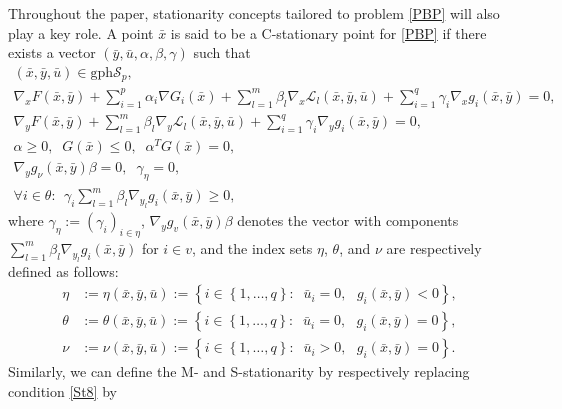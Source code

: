 Throughout the paper, stationarity concepts tailored to problem \eqref{PBP} will also play a key role. A point $\bar{x}$ is said to be a C-stationary point for \eqref{PBP} if there exists a vector $\left(\bar{y},\bar{u}, \alpha,\beta,\gamma\right)$ such that %
	\begin{eqnarray}
	(\bar{x}, \bar{y},\bar{u})\in \mbox{gph}\mathcal{S}_{p},\label{St0}\\
	\nabla_{x}F(\bar{x},\bar{y})+\sum\limits_{i=1}^{p}\alpha_{i}\nabla G_{i}
	(\bar{x})+\sum\limits_{l=1}^{m}\beta_{l}\nabla_{x}\mathcal{L}_{l}(\bar{x}
	,\bar{y},\bar{u})+\sum\limits_{i=1}^{q}\gamma_{i}\nabla_{x}g_{i}(\bar{x}
	,\bar{y})=0,\label{St3}\\
	\nabla_{y}F(\bar{x},\bar{y})+\sum\limits_{l=1}^{m}\beta_{l}\nabla
	_{y}\mathcal{L}_{l}(\bar{x},\bar{y},\bar{u})+\sum\limits_{i=1}^{q}\gamma
	_{i}\nabla_{y}g_{i}(\bar{x},\bar{y})=0,\label{St4}\\[1ex]
	\alpha\geq0,\;\; G(\bar{x})\leq 0, \;\; \alpha^{T}G(\bar{x})=0,\label{St5}\\[1.5ex]
	\nabla_{y}g_{\nu}(\bar{x},\bar{y})\beta=0,  \;\; \gamma_{\eta}=0,\label{St6}\\
	\forall i\in\theta:\;\, \gamma_{i}\sum\limits_{l=1}^{m}\beta_{l}\nabla_{y_{l}}g_{i}(\bar{x},\bar{y})\geq0,\label{St8}
	\end{eqnarray}
	where $\gamma_{\eta}:=(\gamma_{i})_{i\in\eta}$,  $\nabla_{y}g_{v}(\bar{x},\bar{y})\beta$ denotes the vector with components $\sum\limits_{l=1}^{m}\beta_{l}\nabla_{y_{l}}g_{i}(\bar{x},\bar{y})$ for $i\in v$,
	and the index sets $\eta$, $\theta$, and $\nu$ are respectively defined as follows:
	\begin{align}
	\eta &  :=\eta(\bar{x},\bar{y},\bar{u}):=\left\{  i\in\left\{
	1,\ldots,q\right\}:\;\; \bar{u}_{i}=0,\text{ }g_{i}(\bar{x},\bar{y})<0\right\},\label{eq}\\
	\theta &  :=\theta(\bar{x},\bar{y},\bar{u}):=\left\{  i\in\left\{
	1,\ldots,q\right\}: \;\;\bar{u}_{i}=0,\text{ }g_{i}(\bar{x},\bar{y})=0\right\},\label{eqq}\\
	\nu &  :=\nu(\bar{x},\bar{y},\bar{u}):=\left\{  i\in\left\{  1,\ldots,q\right\}
	:\;\; \bar{u}_{i}>0,\text{ }g_{i}(\bar{x},\bar{y})=0\right\}.\label{eqqq}
	\end{align}
Similarly, we can define the M- and S-stationarity by respectively replacing condition \eqref{St8} by
